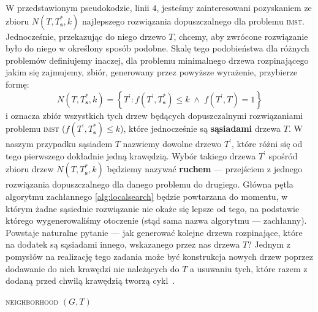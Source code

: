 W przedstawionym pseudokodzie, linii $4$, jesteśmy zainteresowani pozyskaniem ze zbioru $N \left( T, T^{\ast}_{\textbf{s}}, k \right)$ najlepszego rozwiązania dopuszczalnego dla problemu \textsc{imst}. Jednocześnie, przekazując do niego drzewo $T$, chcemy, aby zwrócone rozwiązanie było do niego w określony sposób podobne. Skalę tego podobieństwa dla różnych problemów definiujemy inaczej, dla problemu minimalnego drzewa rozpinającego jakim się zajmujemy, zbiór, generowany przez powyższe wyrażenie, przybierze formę:
\begin{equation}
	N \left( T, T^{\ast}_{\textbf{s}}, k \right) = \left\{ T^{\prime} : f \left( T^{\prime}, T^{\ast}_{\textbf{s}} \right) \leqslant k \; \wedge \; f \left( T^{\prime}, T \right) = 1 \right\}
\end{equation}
i oznacza zbiór wszystkich tych drzew będących dopuszczalnymi rozwiązaniami problemu \textsc{imst} ($f \left( T^{\prime}, T^{\ast}_{\textbf{s}} \right) \leqslant k$), które jednocześnie są \textbf{sąsiadami} drzewa $T$. W naszym przypadku sąsiadem $T$ nazwiemy dowolne drzewo $T^{\prime}$, które różni się od tego pierwszego dokładnie jedną krawędzią. Wybór takiego drzewa $T^{\prime}$ spośród zbioru drzew $N \left( T, T^{\ast}_{\textbf{s}}, k \right)$ będziemy nazywać \textbf{ruchem} --- przejściem z jednego rozwiązania dopuszczalnego dla danego problemu do drugiego. Główna pętla algorytmu zachłannego \ref{alg:localsearch} będzie powtarzana do momentu, w którym żadne sąsiednie rozwiązanie nie okaże się lepsze od tego, na podstawie którego wygenerowaliśmy otoczenie (stąd sama nazwa algorytmu --- zachłanny). Powstaje naturalne pytanie --- jak generować kolejne drzewa rozpinające, które na dodatek są sąsiadami innego, wskazanego przez nas drzewa $T$? Jednym z pomysłów na realizację tego zadania może być konstrukcja nowych drzew poprzez dodawanie do nich krawędzi nie należących do $T$ a usuwaniu tych, które razem z dodaną przed chwilą krawędzią tworzą cykl~\cite{Kasperski2012}.

\begin{pseudokod}[!hbtp]
	\DontPrintSemicolon
	\caption{\textsc{neighborhood} $\left( G, T \right)$}
	\label{alg:neighborhood}
\end{pseudokod}

